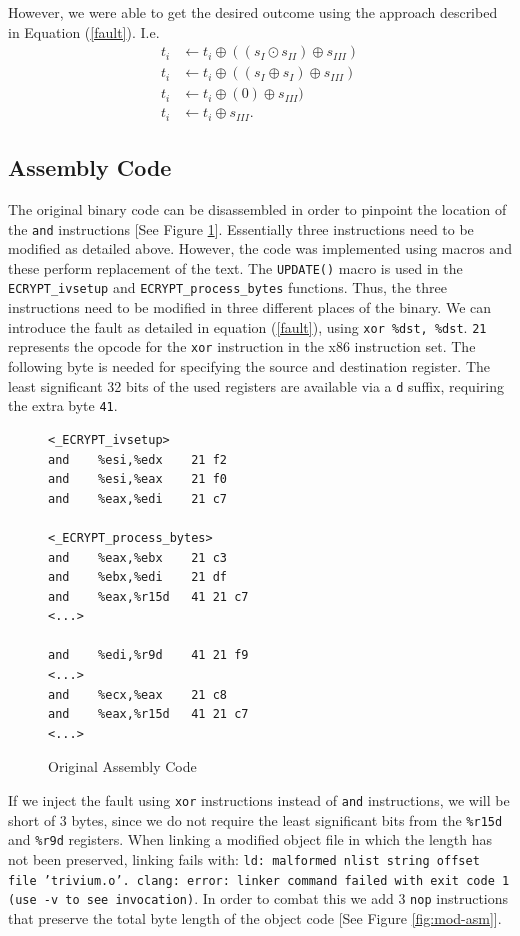 \documentclass[conference]{IEEEtran}
\newcommand{\code}[1]{\texttt{#1}}
\begin{document}
However, we were able to get the desired outcome using the approach described in Equation (\ref{fault}). I.e.
\begin{align*}
t_i &\gets t_i \oplus ((s_I \odot s_{II}) \oplus s_{III})\\
t_i &\gets t_i \oplus ((s_I \oplus s_I) \oplus s_{III})\\
t_i &\gets t_i \oplus (0) \oplus s_{III})\\
t_i &\gets t_i \oplus s_{III}.
\end{align*}

\subsection{Assembly Code}
The original binary code can be disassembled in order to pinpoint the location of the \code{and} instructions [See Figure \ref{fig:orgi-asm}].
Essentially three instructions need to be modified as detailed above. However, the code was implemented using macros and these perform replacement of the text. The \code{UPDATE()} macro is used in the \code{ECRYPT\_ivsetup} and \code{ECRYPT\_process\_bytes} functions. Thus, the three instructions need to be modified in three different places of the binary. 
We can introduce the fault as detailed in equation (\ref{fault}), using \code{xor \%dst, \%dst}. \code{21} represents the opcode for the \code{xor} instruction in the x86 instruction set. The following byte is needed for specifying the source and destination register. The least significant 32 bits of the used registers are available via a \code{d} suffix, requiring the extra byte \code{41}.
\begin{figure}[H]
\begin{lstlisting}[style=asm, frame=tlrb]
<_ECRYPT_ivsetup>
and    %esi,%edx    21 f2
and    %esi,%eax    21 f0
and    %eax,%edi    21 c7

<_ECRYPT_process_bytes>
and    %eax,%ebx    21 c3
and    %ebx,%edi    21 df  
and    %eax,%r15d   41 21 c7
<...>

and    %edi,%r9d    41 21 f9
<...>
and    %ecx,%eax    21 c8
and    %eax,%r15d   41 21 c7
<...>
\end{lstlisting}
\caption{Original Assembly Code}\label{fig:orgi-asm}
\end{figure}

If we inject the fault using \code{xor} instructions instead of \code{and} instructions, we will be short of 3 bytes, since we do not require the least significant bits from the \code{\%r15d} and \code{\%r9d} registers. When linking a modified object file in which the length has not been preserved, linking fails with: \code{ld: malformed nlist string offset file 'trivium.o'. clang: error: linker command failed with exit code 1 (use -v to see invocation)}. In order to combat this we add 3 \code{nop} instructions that preserve the total byte length of the object code [See Figure \ref{fig:mod-asm}].
\end{document}
